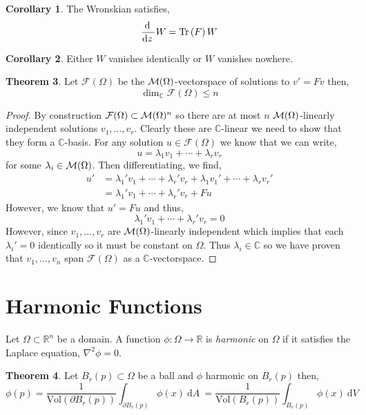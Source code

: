 \documentclass[12pt]{extarticle}
\newcommand{\R}{\mathbb{R}}
\renewcommand{\d}[1]{ \mathrm{d}#1 \:}
\newcommand{\deriv}[2]{\frac{\d{#1}}{\d{#2}}}
\theoremstyle{definition}
\newtheorem{theorem}{Theorem}[section]
\newtheorem{corollary}[theorem]{Corollary}
\newenvironment{definition}[1][Definition:]{\begin{trivlist}
\item[\hskip \labelsep {\bfseries #1}]}{\end{trivlist}}
\newcommand{\F}{\mathcal{F}}
\newcommand{\C}{\mathbb{C}}
\begin{document}
\begin{corollary}
The Wronskian satisfies,
\[ \deriv{}{z} W = \tr{F} W \]
\end{corollary}

\begin{corollary}
Either $W$ vanishes identically or $W$ vanishes nowhere. 
\end{corollary}

\begin{theorem}
Let $\F(\Omega)$ be the $\mathcal{M}(\Omega)$-vectorspace of solutions to $v' = Fv$ then,
\[ \dim_{\C} \F(\Omega) \le n \]
\end{theorem}

\begin{proof}
By construction $\F(\Omega) \subset \M(\Omega)^n$ so there are at most $n$ $\mathcal{M}(\Omega)$-linearly independent solutions $v_1, \dots, v_r$. Clearly these are $\C$-linear we need to show that they form a $\C$-basis. For any solution $u \in \F(\Omega)$ we know that we can write,
\[ u = \lambda_1 v_1 + \cdots + \lambda_r v_r \]
for some $\lambda_i \in \mathcal{M}(\Omega)$. Then differentiating, we find,
\begin{align*}
u' & = \lambda_1' v_1 + \cdots + \lambda_r' v_r + \lambda_1 v_1' + \cdots + \lambda_r v_r'
\\
& = \lambda_1' v_1 + \cdots + \lambda_r' v_r + F u
\end{align*}
However, we know that $u' = F u$ and thus,
\[ \lambda_1' v_1 + \cdots + \lambda_r' v_r = 0 \]
However, since $v_1, \dots, v_r$ are $\mathcal{M}(\Omega)$-linearly independent which implies that each $\lambda_i' = 0$ identically so it must be constant on $\Omega$. Thus $\lambda_i \in \C$ so we have proven that $v_1, \dots, v_n$ span $\F(\Omega)$ as a $\C$-vectorspace. 
\end{proof}

\section{Harmonic Functions}

\newcommand{\Vol}[1]{\mathrm{Vol}\left( #1 \right)}

\begin{definition}
Let $\Omega \subset \R^n$ be a domain. A function $\phi : \Omega \to \R$ is \textit{harmonic} on $\Omega$ if it satisfies the Laplace equation, $\nabla^2 \phi = 0$.
\end{definition}

\begin{theorem}
Let $B_r(p) \subset \Omega$ be a ball and $\phi$ harmonic on $B_r(p)$ then,
\[ \phi(p) = \frac{1}{\Vol{\partial B_r(p)}} \int_{\partial B_r(p)} \phi(x) \: \d{A} = \frac{1}{\Vol{B_r(p)}} \int_{B_r(p)} \phi(x) \: \d{V} \]
\end{theorem}
\end{document}
